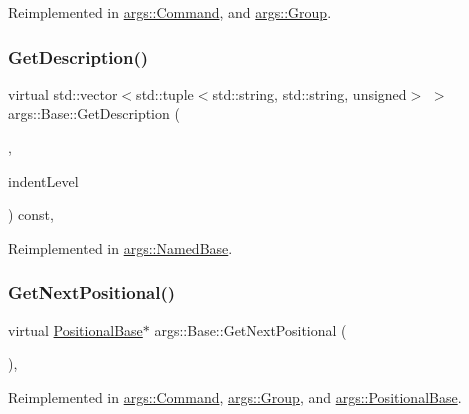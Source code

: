 Reimplemented in \hyperlink{classargs_1_1_command_a59511be164aa3a0cc5fbbfb75ca79fec}{args\+::\+Command}, and \hyperlink{classargs_1_1_group_a83b0a40e16d92c0f387d00a0f35dbf17}{args\+::\+Group}.

\mbox{\label{classargs_1_1_base_afbdf4f1ca1f61182ef0461e02e9e9ed3}} 
\subsubsection{\texorpdfstring{Get\+Description()}{GetDescription()}}
{\footnotesize\ttfamily virtual std\+::vector$<$std\+::tuple$<$std\+::string, std\+::string, unsigned$>$ $>$ args\+::\+Base\+::\+Get\+Description (\begin{DoxyParamCaption}\item[{const \hyperlink{structargs_1_1_help_params}{Help\+Params} \&}]{,  }\item[{const unsigned}]{indent\+Level }\end{DoxyParamCaption}) const\hspace{0.3cm}{\ttfamily [inline]}, {\ttfamily [virtual]}}



Reimplemented in \hyperlink{classargs_1_1_named_base_ab0b9e1f22abf04b24659fada61a6d665}{args\+::\+Named\+Base}.

\mbox{\label{classargs_1_1_base_a3e5ad8516fd2037496cd39bcb3b10f9d}} 
\subsubsection{\texorpdfstring{Get\+Next\+Positional()}{GetNextPositional()}}
{\footnotesize\ttfamily virtual \hyperlink{classargs_1_1_positional_base}{Positional\+Base}$\ast$ args\+::\+Base\+::\+Get\+Next\+Positional (\begin{DoxyParamCaption}{ }\end{DoxyParamCaption})\hspace{0.3cm}{\ttfamily [inline]}, {\ttfamily [virtual]}}



Reimplemented in \hyperlink{classargs_1_1_command_a073266d188b3592f745c64567e566f8a}{args\+::\+Command}, \hyperlink{classargs_1_1_group_ae0fa8f5ae77fda45086e7815617ddff7}{args\+::\+Group}, and \hyperlink{classargs_1_1_positional_base_aaaf09006fd551306b979ea026c49bddb}{args\+::\+Positional\+Base}.

